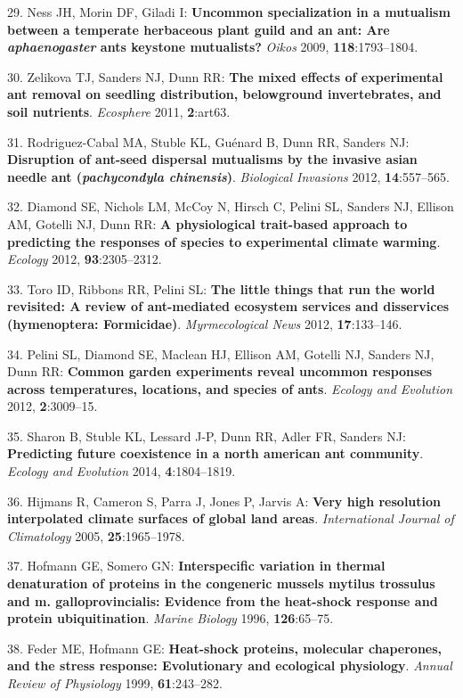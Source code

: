 \documentclass[]{article}
\begin{document}
29. Ness JH, Morin DF, Giladi I: \textbf{Uncommon specialization in a
mutualism between a temperate herbaceous plant guild and an ant: Are
\emph{aphaenogaster} ants keystone mutualists?} \emph{Oikos} 2009,
\textbf{118}:1793--1804.

30. Zelikova TJ, Sanders NJ, Dunn RR: \textbf{The mixed effects of
experimental ant removal on seedling distribution, belowground
invertebrates, and soil nutrients}. \emph{Ecosphere} 2011,
\textbf{2}:art63.

31. Rodriguez-Cabal MA, Stuble KL, Gu{é}nard B, Dunn RR, Sanders NJ:
\textbf{Disruption of ant-seed dispersal mutualisms by the invasive
asian needle ant (\emph{pachycondyla chinensis})}. \emph{Biological
Invasions} 2012, \textbf{14}:557--565.

32. Diamond SE, Nichols LM, McCoy N, Hirsch C, Pelini SL, Sanders NJ,
Ellison AM, Gotelli NJ, Dunn RR: \textbf{A physiological trait-based
approach to predicting the responses of species to experimental climate
warming}. \emph{Ecology} 2012, \textbf{93}:2305--2312.

33. Toro ID, Ribbons RR, Pelini SL: \textbf{The little things that run
the world revisited: A review of ant-mediated ecosystem services and
disservices (hymenoptera: Formicidae)}. \emph{Myrmecological News} 2012,
\textbf{17}:133--146.

34. Pelini SL, Diamond SE, Maclean HJ, Ellison AM, Gotelli NJ, Sanders
NJ, Dunn RR: \textbf{Common garden experiments reveal uncommon responses
across temperatures, locations, and species of ants}. \emph{Ecology and
Evolution} 2012, \textbf{2}:3009--15.

35. Sharon B, Stuble KL, Lessard J-P, Dunn RR, Adler FR, Sanders NJ:
\textbf{Predicting future coexistence in a north american ant
community}. \emph{Ecology and Evolution} 2014, \textbf{4}:1804--1819.

36. Hijmans R, Cameron S, Parra J, Jones P, Jarvis A: \textbf{Very high
resolution interpolated climate surfaces of global land areas}.
\emph{International Journal of Climatology} 2005,
\textbf{25}:1965--1978.

37. Hofmann GE, Somero GN: \textbf{Interspecific variation in thermal
denaturation of proteins in the congeneric mussels mytilus trossulus and
m. galloprovincialis: Evidence from the heat-shock response and protein
ubiquitination}. \emph{Marine Biology} 1996, \textbf{126}:65--75.

38. Feder ME, Hofmann GE: \textbf{Heat-shock proteins, molecular
chaperones, and the stress response: Evolutionary and ecological
physiology}. \emph{Annual Review of Physiology} 1999,
\textbf{61}:243--282.
\end{document}

